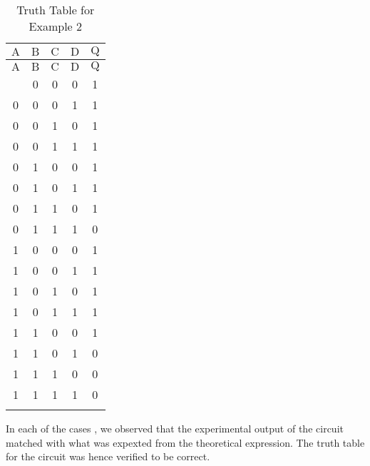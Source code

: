 \documentclass[12pt]{article}
\begin{document}
\begin{longtable}{|c|c|c|c||c|}
	\hline
    $\mathrm{A}$  & $\mathrm{B}$ & $\mathrm{C}$ & $\mathrm{D}$ & $\mathrm{Q}$ \\
  \hline
	\endfirsthead
	\hline
   $\mathrm{A}$  & $\mathrm{B}$ & $\mathrm{C}$ & $\mathrm{D}$ & $\mathrm{Q}$ \\ \hline
	\endhead
	\hline
	\endfoot
	
  \endlastfoot
  0 & 0 & 0 & 0 & 1 \\ \hline
    0 & 0 & 0 & 1 & 1 \\  \hline
    0 & 0 & 1 & 0 & 1 \\  \hline
    0 & 0 & 1 & 1 & 1 \\  \hline
    0 & 1 & 0 & 0 & 1 \\  \hline
    0 & 1 & 0 & 1 & 1 \\  \hline
    0 & 1 & 1 & 0 & 1 \\  \hline
    0 & 1 & 1 & 1 & 0 \\  \hline
    1 & 0 & 0 & 0 & 1 \\  \hline
    1 & 0 & 0 & 1 & 1 \\  \hline
    1 & 0 & 1 & 0 & 1 \\  \hline
    1 & 0 & 1 & 1 & 1 \\  \hline
    1 & 1 & 0 & 0 & 1 \\  \hline
    1 & 1 & 0 & 1 & 0 \\  \hline
    1 & 1 & 1 & 0 & 0 \\  \hline
    1 & 1 & 1 & 1 & 0 \\  \hline
  \caption{Truth Table for Example 2}
  \end{longtable}
\noindent
In each of the cases , we observed that the experimental output of the circuit matched with what was expexted from the theoretical expression. The truth table for the circuit was hence verified to be correct.
\end{document}

